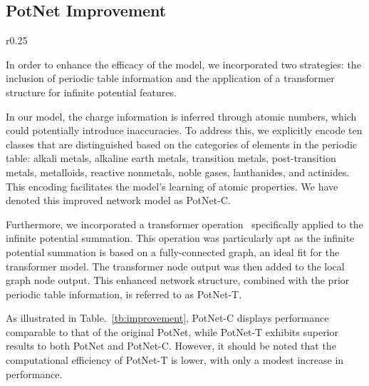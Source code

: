 \documentclass[nohyperref]{article}
\theoremstyle{plain}
\theoremstyle{definition}
\theoremstyle{remark}
\begin{document}
\subsection{PotNet Improvement}
\label{sec:improve}
\begin{wraptable}[9]{r}{0.25\textwidth}
\vspace{-30 pt}
\begin{center}
\caption{PotNet improving techniques by periodic table information and transformer structure on JARVIS formation energy and training time. }\vspace{-0.1cm}
\label{tb:improvement}
\end{center}
\end{wraptable} In order to enhance the efficacy of the model, we incorporated two strategies: the inclusion of periodic table information and the application of a transformer structure for infinite potential features. 

In our model, the charge information is inferred through atomic numbers, which could potentially introduce inaccuracies. To address this, we explicitly encode ten classes that are distinguished based on the categories of elements in the periodic table: alkali metals, alkaline earth metals, transition metals, post-transition metals, metalloids, reactive nonmetals, noble gases, lanthanides, and actinides. This encoding facilitates the model's learning of atomic properties. We have denoted this improved network model as PotNet-C.

Furthermore, we incorporated a transformer operation~\citep{graphormer, yan2022periodic} specifically applied to the infinite potential summation. This operation was particularly apt as the infinite potential summation is based on a fully-connected graph, an ideal fit for the transformer model. The transformer node output was then added to the local graph node output. This enhanced network structure, combined with the prior periodic table information, is referred to as PotNet-T.

As illustrated in Table.~\ref{tb:improvement}, PotNet-C displays performance comparable to that of the original PotNet, while PotNet-T exhibits superior results to both PotNet and PotNet-C. However, it should be noted that the computational efficiency of PotNet-T is lower, with only a modest increase in performance.
\end{document}
